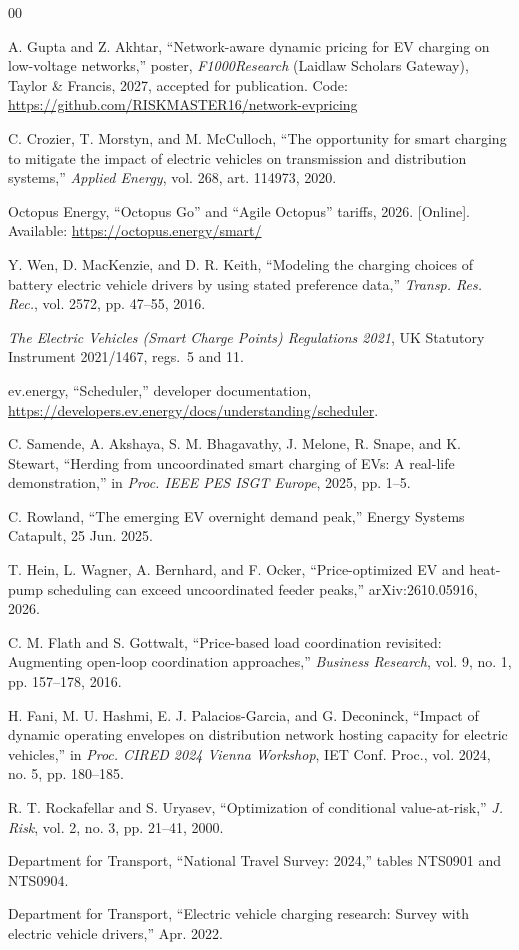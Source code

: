 \documentclass[conference]{IEEEtran}
\begin{document}
\begin{thebibliography}{00}

 A. Gupta and Z. Akhtar, ``Network-aware dynamic pricing for
EV charging on low-voltage networks,'' poster, \emph{F1000Research} (Laidlaw
Scholars Gateway), Taylor \& Francis, 2027, accepted for publication. Code:
\url{https://github.com/RISKMASTER16/network-evpricing}

 C. Crozier, T. Morstyn, and M. McCulloch, ``The
opportunity for smart charging to mitigate the impact of electric vehicles on
transmission and distribution systems,'' \emph{Applied Energy}, vol. 268,
art. 114973, 2020.

 Octopus Energy, ``Octopus Go'' and ``Agile Octopus'' tariffs, 2026.
[Online]. Available: \url{https://octopus.energy/smart/}

 Y. Wen, D. MacKenzie, and D. R. Keith, ``Modeling the charging
choices of battery electric vehicle drivers by using stated preference
data,'' \emph{Transp. Res. Rec.}, vol. 2572, pp. 47--55, 2016.

 \emph{The Electric Vehicles (Smart Charge Points)
Regulations 2021}, UK Statutory Instrument 2021/1467, regs.~5 and 11.

 ev.energy, ``Scheduler,'' developer documentation,
\url{https://developers.ev.energy/docs/understanding/scheduler}.

 C. Samende, A. Akshaya, S. M. Bhagavathy, J. Melone,
R. Snape, and K. Stewart, ``Herding from uncoordinated smart charging of
EVs: A real-life demonstration,'' in \emph{Proc. IEEE PES ISGT Europe},
2025, pp. 1--5.

 C. Rowland, ``The emerging EV overnight demand
peak,'' Energy Systems Catapult, 25 Jun. 2025.

 T. Hein, L. Wagner, A. Bernhard, and F. Ocker,
``Price-optimized EV and heat-pump scheduling can exceed uncoordinated feeder
peaks,'' arXiv:2610.05916, 2026.

 C. M. Flath and S. Gottwalt, ``Price-based load
coordination revisited: Augmenting open-loop coordination approaches,''
\emph{Business Research}, vol. 9, no. 1, pp. 157--178, 2016.

 H. Fani, M. U. Hashmi, E. J. Palacios-Garcia, and
G. Deconinck, ``Impact of dynamic operating envelopes on distribution network
hosting capacity for electric vehicles,'' in \emph{Proc. CIRED 2024 Vienna
Workshop}, IET Conf. Proc., vol. 2024, no. 5, pp. 180--185.

 R. T. Rockafellar and S. Uryasev, ``Optimization of
conditional value-at-risk,'' \emph{J. Risk}, vol. 2, no. 3, pp. 21--41, 2000.

 Department for Transport, ``National Travel Survey: 2024,''
tables NTS0901 and NTS0904.

 Department for Transport, ``Electric vehicle charging
research: Survey with electric vehicle drivers,'' Apr. 2022.

\end{thebibliography}
\end{document}
